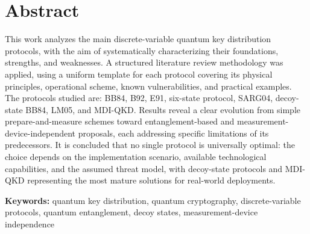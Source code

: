 \chapter{Abstract}
This work analyzes the main discrete-variable quantum key distribution protocols, with the aim of systematically characterizing their foundations, strengths, and weaknesses. A structured literature review methodology was applied, using a uniform template for each protocol covering its physical principles, operational scheme, known vulnerabilities, and practical examples. The protocols studied are: BB84, B92, E91, six-state protocol, SARG04, decoy-state BB84, LM05, and MDI-QKD. Results reveal a clear evolution from simple prepare-and-measure schemes toward entanglement-based and measurement-device-independent proposals, each addressing specific limitations of its predecessors. It is concluded that no single protocol is universally optimal: the choice depends on the implementation scenario, available technological capabilities, and the assumed threat model, with decoy-state protocols and MDI-QKD representing the most mature solutions for real-world deployments.

\vspace{0.5cm}
{\bf Keywords:} quantum key distribution, quantum cryptography, discrete-variable protocols, quantum entanglement, decoy states, measurement-device independence

\mainmatter